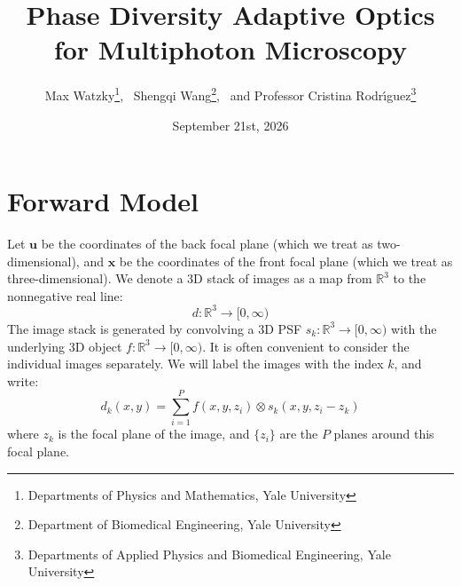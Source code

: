 \documentclass{article}
\title{Phase Diversity Adaptive Optics for Multiphoton Microscopy}
\author{ Max Watzky\footnote{Departments of Physics and Mathematics, Yale University}, \ Shengqi Wang\footnote{Department of Biomedical Engineering, Yale University}, \ and Professor Cristina Rodr\'{\i}guez\footnote{Departments of Applied Physics and Biomedical Engineering, Yale University}}
\date{September 21st, 2026}
\begin{document}
\maketitle

\section{Forward Model}
Let $\mathbf{u}$ be the coordinates of the back focal plane (which we treat as two-dimensional), and
$\mathbf{x}$ be the coordinates of the front focal plane (which we treat as three-dimensional). We denote a 3D stack of images as a map from $\mathbb{R}^3$ to the nonnegative real line:
\begin{equation}
d: \mathbb{R}^3 \to [0, \infty)
\end{equation}
The image stack is generated by convolving a 3D PSF $s_k: \mathbb{R}^3 \to [0, \infty)$ with the underlying 3D object $f: \mathbb{R}^3 \to [0, \infty)$. It is often convenient to consider the individual images separately. We will label the images with the index $k$, and write:
\begin{equation}
d_k(x, y) = \sum_{i=1}^P f(x, y, z_i) \otimes s_k(x, y, z_i - z_k)
\end{equation}
where $z_k$ is the focal plane of the image, and $\{z_i\}$ are the $P$ planes around this focal plane.
\end{document}
